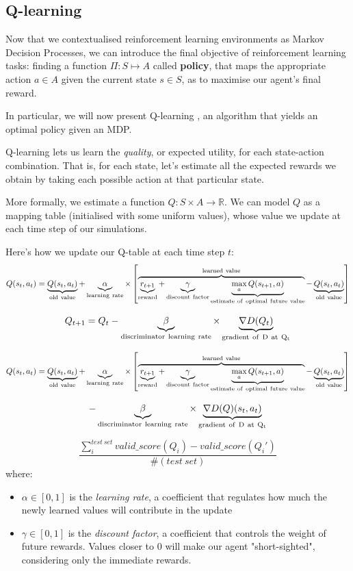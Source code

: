 \subsection{Q-learning}
\label{qlearning}
Now that we contextualised reinforcement learning environments as Markov Decision Processes, we can introduce the final objective of reinforcement learning tasks: finding a function $\Pi:S\mapsto A$ called \textbf{policy}, that maps the appropriate action $a\in A$ given the current state $s\in S$, as to maximise our agent's final reward.

In particular, we will now present Q-learning \parencite{watkins1992q}, an algorithm that yields an optimal policy given an MDP.

Q-learning lets us learn the \emph{quality}, or expected utility, for each state-action combination. That is, for each state, let's estimate all the expected rewards we obtain by taking each possible action at that particular state.

More formally, we estimate a function $Q: S \times A \to \mathbb{R}$. We can model $Q$ as a mapping table (initialised with some uniform values), whose value we update at each time step of our simulations.

Here's how we update our Q-table at each time step $t$:
  \[Q(s_{t},a_{t}) = \underbrace{Q(s_t,a_t)}_{\rm old~value} +
  \underbrace{\alpha}_{\rm learning~rate} \times \left[
    \overbrace{\underbrace{r_{t+1}}_{\rm reward} + \underbrace{\gamma}_{\rm
        discount~factor} \underbrace{\max_{a}Q(s_{t+1}, a)}_{\rm
        estimate~of~optimal~future~value}}^{\rm learned~value} -
    \underbrace{Q(s_t,a_t)}_{\rm old~value} \right] \]

\[Q_{t+1} = Q_{t}-\underbrace{\beta}_{\rm discriminator~learning~rate} \times \underbrace{\nabla D(Q_{t})}_{\rm gradient~of~D~at~Q_{t}}\]

  \[Q(s_{t},a_{t}) = \underbrace{Q(s_t,a_t)}_{\rm old~value} +
  \underbrace{\alpha}_{\rm learning~rate} \times \left[
    \overbrace{\underbrace{r_{t+1}}_{\rm reward} + \underbrace{\gamma}_{\rm
        discount~factor} \underbrace{\max_{a}Q(s_{t+1}, a)}_{\rm
        estimate~of~optimal~future~value}}^{\rm learned~value} -
    \underbrace{Q(s_t,a_t)}_{\rm old~value} \right]\]
    
    \[- \underbrace{\beta}_{\rm discriminator~learning~rate} \times \underbrace{\nabla D(Q)(s_{t}, a_{t})}_{\rm gradient~of~D~at~Q_{t}} \]
   
   \[\frac{\sum_{i}^{test~set} valid\_score(Q_i) - valid\_score(Q_i')}{\#(test~set)}\]
where:
\begin{itemize}
	\item $\alpha\in[0,1]$ is the \emph{learning rate}, a coefficient that regulates how much the newly learned values will contribute in the update
	\item $\gamma\in[0,1]$ is the \emph{discount factor}, a coefficient that controls the weight of future rewards. Values closer to 0 will make our agent "short-sighted", considering only the immediate rewards.
\end{itemize}

